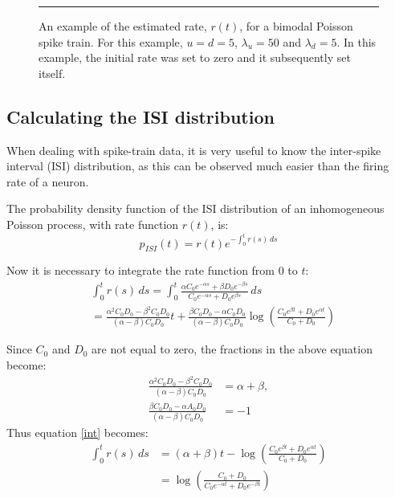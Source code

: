 \begin{figure}

\bigskip
\rule{33em}{0.5pt}
\caption{An example of the estimated rate, $r(t)$, for a bimodal Poisson spike train.  For this example, $u=d=5$, $\lambda_u=50$ and $\lambda_d=5$.  In this example, the initial rate was set to zero and it subsequently set itself.}
\end{figure}

\subsection{Calculating the ISI distribution}

When dealing with spike-train data, it is very useful to know the inter-spike interval (ISI) distribution, as this can be observed much easier than the firing rate of a neuron.

The probability density function of the ISI distribution of an inhomogeneous Poisson process, with rate function $r(t)$, is:
\begin{equation}
p_{ISI}(t) = r(t) e^{-\int_0^t r(s)\,ds}
\end{equation}

Now it is necessary to integrate the rate function from $0$ to $t$:
\begin{equation}
\begin{split}
\label{int}
&\int_0^t r(s)\,ds = \int_0^t  \frac{\alpha C_0e^{-\alpha s}+\beta D_0e^{-\beta s}}{C_0e^{-\alpha s} + D_0e^{\beta s}}\,ds\\ 
&= \frac{\alpha^2 C_0D_0 - \beta^2 C_0D_0}{(\alpha - \beta)C_0D_0}t + \frac{\beta C_0D_0-\alpha C_0D_0}{(\alpha - \beta)C_0D_0} \log\left({\frac{C_0e^{\beta t} + D_0e^{\alpha t}}{C_0 + D_0} }\right)
\end{split}
\end{equation}

Since $C_0$ and $D_0$ are not equal to zero, the fractions in the above equation become:
\begin{equation}
\begin{split}
\frac{\alpha^2 C_0D_0 - \beta^2 C_0D_0}{(\alpha - \beta)C_0D_0} & = \alpha+\beta,\\
 \frac{ \beta C_0D_0-\alpha A_0D_0}{(\alpha - \beta)C_0D_0} &= -1
\end{split}
\end{equation}
Thus equation \ref{int} becomes:
\begin{equation}
\begin{split}
\int_0^t r(s)\,ds &= (\alpha+\beta)t - \log\left( {\frac{C_0e^{\beta t} + D_0e^{\alpha t}}{C_0 + D_0} }\right) \\
&= \log \left( \frac{C_0+D_0}{C_0e^{-\alpha t}+D_0e^{-\beta t}}\right)
\end{split}
\end{equation}

